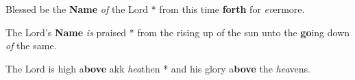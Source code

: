 \begin{multicols}{2}
	Blessed be the \textbf{Name} \textit{of} the Lord * from this time \textbf{forth} for \textit{ev}ermore.
	
	The Lord's \textbf{Name} \textit{is} praised * from the rising up of the sun unto the \textbf{go}ing down \textit{of} the same.
	
	The Lord is high a\textbf{bove} akk \textit{hea}then * and his glory a\textbf{bove} the \textit{hea}vens.
\end{multicols}